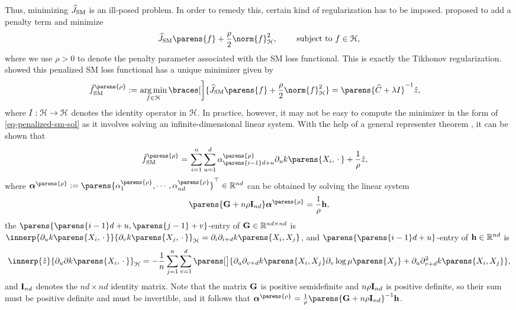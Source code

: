 Thus, minimizing $\widehat{J}_{\mathrm{SM}}$ is an ill-posed problem. In order to remedy this, certain kind of regularization has to be imposed. %
\textcite{Sriperumbudur-density-estimation-inf-exp-family} proposed to add a penalty term and minimize 
\begin{align*}
	\widehat{J}_{\SM} \parens{f} + \frac{\rho}{2} \norm{f}_{\calH}^2, \qquad \text{ subject to } f \in \calH, 
\end{align*}
where we use $\rho > 0$ to denote the penalty parameter associated with the SM loss functional. 
This is exactly the Tikhonov regularization. \textcite{Sriperumbudur-density-estimation-inf-exp-family} showed this penalized SM loss functional has a unique minimizer given by 
\begin{align}\label{eq-penalized-sm-sol}
	\hat{f}_{\SM}^{\parens{\rho}} := & \, \argmin_{f \in \calH} \braces[\bigg]{\widehat{J}_{\SM} \parens{f} + \frac{\rho}{2} \norm{f}_{\calH}^2} = \parens{\widehat{C} + \lambda I}^{-1} \hat{z}, 
\end{align}
where $I: \mathcal{H} \to \mathcal{H}$ denotes the identity operator in $\mathcal{H}$. In practice, however, it may not be easy to compute the minimizer in the form of \eqref{eq-penalized-sm-sol} as it involves solving an infinite-dimensional linear system. With the help of a general representer theorem \parencites[Theorem A.2 in][]{Sriperumbudur-density-estimation-inf-exp-family}, it can be shown that 
\begin{align*}
	\hat{f}_{\SM}^{\parens{\rho}} = & \, \sum_{i=1}^n \sum_{u=1}^d \alpha_{\parens{i-1}d+u}^{\parens{\rho}} \partial_u k \parens{X_i, \,\cdot\,} + \frac{1}{\rho} \hat{z}, 
\end{align*}
where $\balpha^{\parens{\rho}} := \parens{\alpha_{1}^{\parens{\rho}}, \cdots, \alpha_{nd}^{\parens{\rho}}}^\top \in \Real^{nd}$ can be obtained by solving the linear system
\begin{align*}
	\parens{\bG + n \rho \bI_{nd}} \balpha^{\parens{\rho}} = \frac{1}{\rho} \bh, 
\end{align*}
the $\parens{\parens{i-1}d+u, \parens{j-1}+v}$-entry of $\mathbf{G} \in \mathbb{R}^{nd \times nd}$ is $\innerp{\partial_u k \parens{X_i, \,\cdot\,}}{\partial_v k \parens{X_j, \,\cdot\,}}_{\calH} = \partial_i \partial_{i+d} k \parens{X_i, X_j}$, and $\parens{\parens{i-1}d+u}$-entry of $\mathbf{h} \in \mathbb{R}^{nd}$ is 
\begin{align*}
	\innerp{\hat{z}}{\partial_u \partial k \parens{X_i, \,\cdot\,}}_{\calH} = - \frac{1}{n} \sum_{j=1}^n \sum_{v=1}^d \parens[\big]{\partial_u \partial_{v+d} k \parens{X_i, X_j} \partial_v \log \mu \parens{X_j} + \partial_u \partial^2_{v+d} k \parens{X_i, X_j} }, 
\end{align*}
and $\mathbf{I}_{nd}$ denotes the $nd \times nd$ identity matrix. 
Note that the matrix $\mathbf{G}$ is positive semidefinite and $n \rho \mathbf{I}_{nd}$ is positive definite, so their sum must be positive definite and must be invertible, and it follows that $\balpha^{\parens{\rho}} = \frac{1}{\rho} \parens{\bG + n \rho \bI_{nd}}^{-1} \bh$. 

